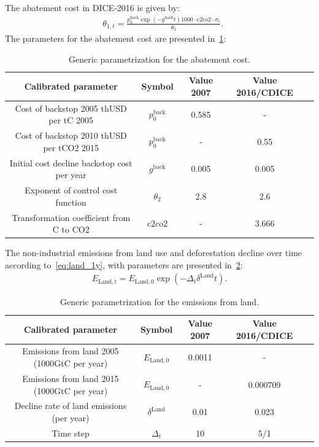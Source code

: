\documentclass[11pt, a4paper, pdftex, twoside, dvipsnames]{article}
\begin{document}
\begin{appendices}
\noindent The abatement cost in DICE-2016 is given by:\\
\begin{align}
        \label{eq:abat_1y_2016}
        &\theta_{1,t} =
        \frac{p^{\text{back}}_{0}\exp\left(-g^{\text{back}}t \right)1000 \cdot \text{c2co2} \cdot \sigma_{t}}{\theta_{2}}.
\end{align}
The parameters for the abatement cost are presented in~\cref{table:theta}:
\begin{table}[H]
\centering
\begin{tabular}{ c c c c c  } 
 \toprule
 Calibrated parameter & Symbol  & Value 2007 & Value 2016/CDICE \\ 
 \midrule
 Cost of backstop  2005 thUSD per tC 2005 & $p^{\text{back}}_{0}$  & 0.585 & -  \\ 
  Cost of backstop  2010 thUSD per tCO2 2015 & $p^{\text{back}}_{0}$  & - & 0.55  \\ 
 Initial cost decline backstop cost per year & $g^{\text{back}}$  & 0.005 & 0.005 \\ 
 Exponent of control cost function & $\theta_{2}$  & 2.8 & 2.6 \\
 Transformation coefficient from C to CO2 & $\text{c2co2}$  & - & 3.666 \\
 \bottomrule
\end{tabular}
\caption{Generic parametrization for the abatement cost.}
\label{table:theta}
\end{table}

The non-industrial emissions from land use and deforestation decline over time according to~\cref{eq:land_1y}, with parameters are presented in~\cref{table:eland}:
\begin{align}
        \label{eq:land_1y}
      E_{\text{Land},t} =
      E_{\text{Land},0}\exp\left(-\Delta_t\delta^{\text{Land}}t\right).
\end{align}

\begin{table}[H]
\centering
\begin{tabular}{ c c c c c  } 
 \toprule
 Calibrated parameter & Symbol  & Value 2007 & Value 2016/CDICE \\ 
 \midrule
 Emissions from land 2005 (1000GtC per year) & $E_{\text{Land},0}$  & 0.0011 & -  \\ 
  Emissions from land 2015 (1000GtC per year) & $E_{\text{Land},0}$  & - & 0.000709 \\ 
 Decline rate of land emissions (per year) & $\delta^{\text{Land}}$  & 0.01 & 0.023 \\ 
 Time step & $\Delta_t$  & 10 & 5/1 \\
 \bottomrule
\end{tabular}
\caption{Generic parametrization for the emissions from land.}
\label{table:eland}
\end{table}


\end{appendices}
\end{document}
